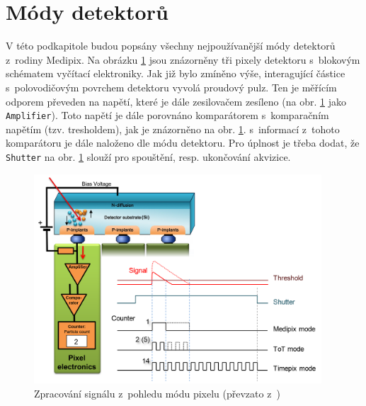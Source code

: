 \section{Módy detektorů}\label{det:mod}
V této podkapitole budou popsány všechny nejpoužívanější módy detektorů z~rodiny Medipix. 
Na obrázku \ref{fig:det:signal_proc} jsou znázorněny tři pixely detektoru s~blokovým schématem vyčítací elektroniky. Jak již bylo zmíněno výše, interagující částice s~polovodičovým povrchem detektoru vyvolá proudový pulz. Ten je měřícím odporem převeden na napětí, které je dále zesilovačem zesíleno (na obr. \ref{fig:det:signal_proc} jako \texttt{Amplifier}). Toto napětí je dále porovnáno komparátorem s~komparačním napětím (tzv. tresholdem), jak je znázorněno na obr. \ref{fig:det:signal_proc}. s~informací z~tohoto komparátoru je dále naloženo dle módu detektoru. Pro úplnost je třeba dodat, že \texttt{Shutter} na obr. \ref{fig:det:signal_proc} slouží pro spouštění, resp. ukončování akvizice.

\begin{figure}[th!]
	\begin{center}
		\includegraphics[width=10.75cm]{figures/det_pix.png}
		\caption{Zpracování signálu z~pohledu módu pixelu (převzato z~\cite{PlatkevicDisertace})}
		\label{fig:det:signal_proc}
	\end{center}
\end{figure}

